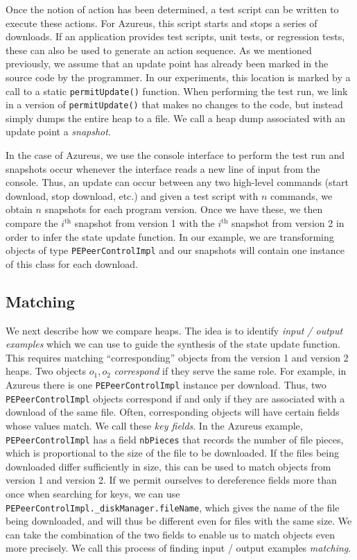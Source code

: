 Once the notion of action has been determined, a test script can be
written to execute these actions.  For Azureus, this script starts and
stops a series of downloads.  If an application provides test scripts,
unit tests, or regression tests, these can also be used to generate an
action sequence.  As we mentioned previously, we assume that an update
point has already been marked in the source code by the programmer.
In our experiments, this location is marked by a call to a static
\texttt{permitUpdate()} function.  When performing the test run, we
link in a version of \texttt{permitUpdate()} that makes no changes to
the code, but instead simply dumps the entire heap to a file.  We call
a heap dump associated with an update point a \emph{snapshot}.

In the case of Azureus, we use the console interface to perform the
test run and snapshots occur whenever the interface reads a new line
of input from the console.  Thus, an update can occur between any two
high-level commands (start download, stop download, etc.) and given a
test script with $n$ commands, we obtain $n$ snapshots for each
program version.  Once we have these, we then compare the
$i^\text{th}$ snapshot from version 1 with the $i^\text{th}$ snapshot
from version 2 in order to infer the state update function.  In our
example, we are transforming objects of type
\texttt{PEPeerControlImpl} and our snapshots will contain one instance
of this class for each download.

\subsection{Matching}

We next describe how we compare heaps.  The idea is to identify
\emph{input / output examples} which we can use to guide the synthesis
of the state update function.  This requires matching
``corresponding'' objects from the version 1 and version 2 heaps.  Two
objects $o_1,o_2$ \emph{correspond} if they serve the same role.  For
example, in Azureus there is one \texttt{PEPeerControlImpl} instance
per download.  Thus, two \texttt{PEPeerControlImpl} objects correspond
if and only if they are associated with a download of the same file.
Often, corresponding objects will have certain fields whose values
match.  We call these \emph{key fields}.  In the Azureus example,
\texttt{PEPeerControlImpl} has a field \texttt{nbPieces} that records
the number of file pieces, which is proportional to the size of the
file to be downloaded.  If the files being downloaded differ
sufficiently in size, this can be used to match objects from version 1
and version 2.  If we permit ourselves to dereference fields more than
once when searching for keys, we can use
\texttt{PEPeerControlImpl.\_diskManager.fileName}, which gives the
name of the file being downloaded, and will thus be different even for
files with the same size.  We can take the combination of the two
fields to enable us to match objects even more precisely.  We call
this process of finding input / output examples \emph{matching}.

